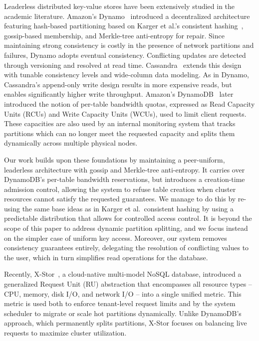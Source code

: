 Leaderless distributed key-value stores have been extensively studied in the academic literature.
Amazon’s Dynamo~\cite{Dynamo2007} introduced a decentralized architecture featuring hash-based partitioning
based on Karger et al.'s consistent hashing~\cite{ConsistentHashing}, gossip-based membership, and Merkle-tree anti-entropy for repair.
Since maintaining strong consistency is costly in the presence of network partitions and failures, Dynamo adopts eventual consistency.
Conflicting updates are detected through versioning and resolved at read time.
Cassandra~\cite{Cassandra} extends this design with tunable consistency levels and wide-column data modeling.
As in Dynamo, Cassandra’s append-only write design results in more expensive reads,
but enables significantly higher write throughput.
Amazon’s DynamoDB~\cite{Dynamo2022, DynamoWhitepaper} later introduced the notion of per-table bandwidth quotas,
expressed as Read Capacity Units (RCUs) and Write Capacity Units (WCUs), used to limit client requests.
These capacities are also used by an internal monitoring system that tracks partitions which can no longer meet the requested capacity
and splits them dynamically across multiple physical nodes.

Our work builds upon these foundations by maintaining a peer-uniform, leaderless architecture with gossip and Merkle-tree anti-entropy.
It carries over DynamoDB's per-table bandwidth reservations, but introduces a creation-time admission control,
allowing the system to refuse table creation when cluster resources cannot satisfy the requested guarantees.
We manage to do this by re-using the same base ideas as in Karger et al.\ consistent hashing by using
a predictable distribution that allows for controlled access control.
It is beyond the scope of this paper to address dynamic partition splitting, and we focus instead on the simpler case of uniform key access.
Moreover, our system removes consistency guarantees entirely, delegating the resolution of conflicting values to the user,
which in turn simplifies read operations for the database.

Recently, X-Stor~\cite{XStor}, a cloud-native multi-model NoSQL database, introduced a generalized Request Unit (RU) abstraction
that encompasses all resource types -- CPU, memory, disk I/O, and network I/O -- into a single unified metric.
This metric is used both to enforce tenant-level request limits and by the system scheduler to migrate or scale hot partitions dynamically.
Unlike DynamoDB’s approach, which permanently splits partitions, X-Stor focuses on balancing live requests to maximize cluster utilization.

